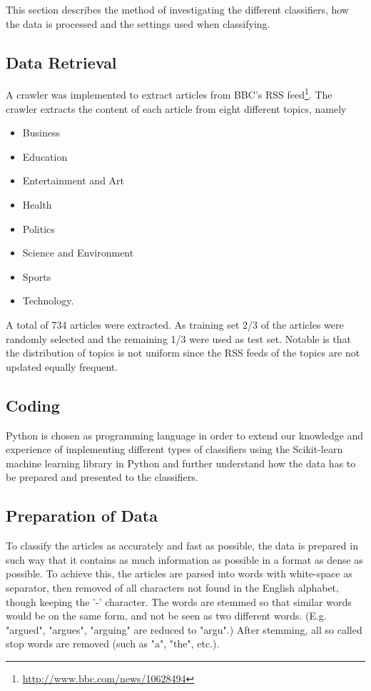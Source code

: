 This section describes the method of investigating the different classifiers, how the data is processed and the settings used when classifying.
\subsection{Data Retrieval}
A crawler was implemented to extract articles from BBC's RSS feed\footnote{\url{http://www.bbc.com/news/10628494}}. The crawler extracts the content of each article from eight different topics, namely
\begin{itemize}[noitemsep,nolistsep]
\small
	\item Business
	\item Education
	\item Entertainment and Art
	\item Health
	\item Politics
	\item Science and Environment
	\item Sports
	\item Technology.
\end{itemize}
A total of 734 articles were extracted. As training set 2/3 of the articles were randomly selected and the remaining 1/3 were used as test set. Notable is that the distribution of topics is not uniform since the RSS feeds of the topics are not updated equally frequent. 
\subsection{Coding}
Python is chosen as programming language in order to extend our knowledge and experience of implementing different types of classifiers using the Scikit-learn machine learning library in Python and further understand how the data has to be prepared and presented to the classifiers.
\subsection{Preparation of Data}
To classify the articles as accurately and fast as possible, the data is prepared in such way that it contains as much information as possible in a format as dense as possible. To achieve this, the articles are parsed into words with white-space as separator, then removed of all characters not found in the English alphabet, though keeping the '-' character. The words are stemmed so that similar words would be on the same form, and not be seen as two different words. (E.g. "argued", "argues", "arguing" are reduced to "argu".) After stemming, all so called stop words are removed (such as "a", "the", etc.). 
